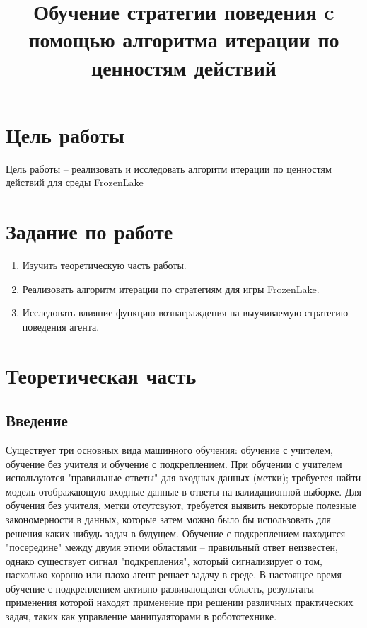 \documentclass[fleqn, a4paper, 14pt]{article}
\title{Обучение стратегии поведения c помощью алгоритма итерации по ценностям действий}
\date{}
\begin{document}
	\maketitle

	\tableofcontents
	\newpage
	\section{Цель работы}
	Цель работы -- реализовать и исследовать алгоритм итерации по ценностям действий для среды FrozenLake
	\section{Задание по работе}
	\begin{enumerate}
	\item Изучить теоретическую часть работы.
	\item Реализовать алгоритм итерации по стратегиям для игры FrozenLake.
	\item Исследовать влияние функцию вознаграждения на выучиваемую стратегию поведения агента.
	\end{enumerate}
	\section{Теоретическая часть}
	\subsection{Введение}
	Существует три основных вида машинного обучения: обучение с учителем, обучение без учителя и обучение с подкреплением. При обучении с учителем используются "правильные ответы" для входных данных (метки); требуется найти модель отображающую входные данные в ответы на валидационной выборке. Для обучения без учителя, метки отсутсвуют, требуется выявить некоторые полезные закономерности в данных, которые затем можно было бы использовать для решения каких-нибудь задач в будущем. Обучение с подкреплением находится "посередине" между двумя этими областями -- правильный ответ неизвестен, однако существует сигнал "подкрепления", который сигнализирует о том, насколько хорошо или плохо агент решает задачу в среде. В настоящее время обучение с подкреплением активно развивающаяся область, результаты применения которой находят применение при решении различных практических задач, таких как управление манипуляторами в робототехнике.
	
\end{document}
